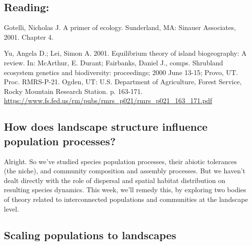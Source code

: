 \documentclass[12pt]{article}
\begin{document}
\subsection*{Reading:}


Gotelli, Nicholas J. A primer of ecology. Sunderland, MA: Sinauer Associates, 2001. Chapter 4. \\

\bigskip

Yu, Angela D.; Lei, Simon A. 2001. Equilibrium theory of island biogeography: A review. In: McArthur, E. Durant; Fairbanks, Daniel J., comps. Shrubland ecosystem genetics and biodiversity: proceedings; 2000 June 13-15; Provo, UT. Proc. RMRS-P-21. Ogden, UT: U.S. Department of Agriculture, Forest Service, Rocky Mountain Research Station. p. 163-171. \url{https://www.fs.fed.us/rm/pubs/rmrs_p021/rmrs_p021_163_171.pdf}















\begin{center}
\noindent\hrulefill 
\end{center}





\clearpage
\subsection*{How does landscape structure influence population processes?}

Alright. So we've studied species population processes, their abiotic tolerances (the niche), and community composition and assembly processes. But we haven't dealt directly with the role of dispersal and spatial habitat distribution on resulting species dynamics. This week, we'll remedy this, by exploring two bodies of theory related to interconnected populations and communities at the landscape level. 





\clearpage



\subsection*{Scaling populations to landscapes}
\end{document}
